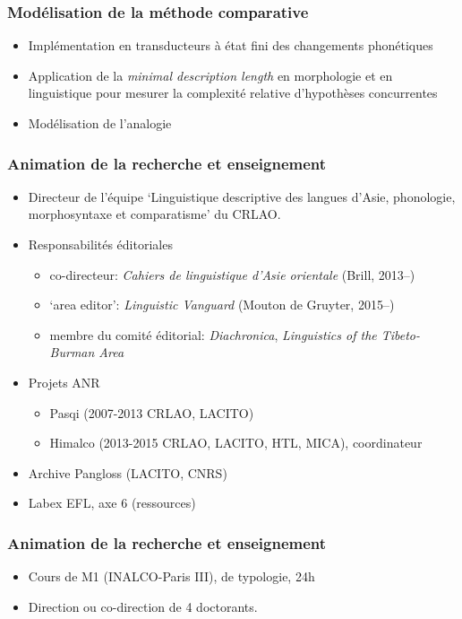 \documentclass[xcolor=table]{beamer}
\begin{document}
   \begin{frame} 
 \frametitle{Modélisation de la méthode comparative} 
 \begin{itemize}%
 \item  Implémentation en transducteurs à état fini des changements phonétiques
  \item Application de la \textit{minimal description length} en morphologie et en linguistique pour mesurer la complexité relative d'hypothèses concurrentes
  \item Modélisation de l'analogie
\end{itemize}
   \end{frame} 
   
   \begin{frame} 
 \frametitle{Animation de la recherche et enseignement} 
 \begin{itemize}%
 \item  Directeur de l'équipe  `Linguistique descriptive des langues d’Asie, phonologie, morphosyntaxe et comparatisme' du CRLAO.
\item Responsabilités éditoriales
    \begin{itemize}%
\item  co-directeur: \textit{Cahiers de linguistique d'Asie orientale} (Brill, 2013--)
\item  `area editor': \textit{Linguistic Vanguard} (Mouton de Gruyter, 2015--)
\item membre du comité éditorial: \textit{Diachronica}, \textit{Linguistics of the Tibeto-Burman Area}
\end{itemize}
 \item  Projets ANR
  \begin{itemize}%
 \item  Pasqi (2007-2013 CRLAO, LACITO)
  \item Himalco (2013-2015 CRLAO, LACITO, HTL, MICA), coordinateur
\end{itemize}
 \item  Archive Pangloss (LACITO, CNRS)
  \item Labex EFL, axe 6 (ressources)
\end{itemize}
   \end{frame} 

 
\begin{frame} 
\frametitle{Animation de la recherche et enseignement} 
   \begin{itemize}%
\item Cours de M1 (INALCO-Paris III), de typologie, 24h
\item Direction ou co-direction de 4 doctorants.
 \end{itemize}
\end{frame} 
 
\end{document}
